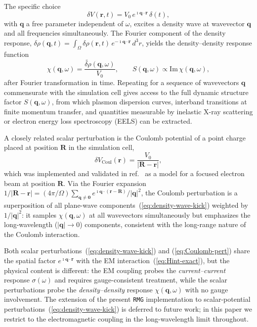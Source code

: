 {{The specific choice
\begin{equation}
  \delta V(\mathbf{r},t)
  = V_0\,e^{\imath\mathbf{q}\cdot\mathbf{r}}\,\delta(t),
  \label{eq:density-wave-kick}
\end{equation}
with $\mathbf{q}$ a free parameter independent of $\omega$,
excites a density wave at wavevector $\mathbf{q}$ and all
frequencies simultaneously.
The Fourier component of the density response,
$\delta\rho(\mathbf{q},t) =
\int_\Omega\delta\rho(\mathbf{r},t)\,e^{-\imath\mathbf{q}\cdot\mathbf{r}}
\,d^3r$,
yields the density--density response function
\begin{equation}
  \chi(\mathbf{q},\omega)
  = \frac{\widetilde{\delta\rho}(\mathbf{q},\omega)}{V_0},
  \qquad
  S(\mathbf{q},\omega) \propto \mathrm{Im}\,\chi(\mathbf{q},\omega),
  \label{eq:chi-q}
\end{equation}
after Fourier transformation in time.
Repeating for a sequence of wavevectors $\mathbf{q}$ commensurate
with the simulation cell gives access to the full dynamic structure
factor $S(\mathbf{q},\omega)$, from which plasmon dispersion curves,
interband transitions at finite momentum transfer, and quantities
measurable by inelastic X-ray scattering or electron energy loss
spectroscopy (EELS) can be extracted.

A closely related scalar perturbation is the Coulomb potential of a
point charge placed at position $\mathbf{R}$ in the simulation cell,
\begin{equation}
  \delta V_\mathrm{Coul}(\mathbf{r})
  = \frac{V_0}{|\mathbf{R}-\mathbf{r}|},
  \label{eq:Coulomb-pert}
\end{equation}
which was implemented and validated in ref.~\cite{jakowski-tddft-coulomb-2019}
 as a model for a focused
electron beam at position $\mathbf{R}$.
Via the Fourier expansion
$1/|\mathbf{R}-\mathbf{r}|
=(4\pi/\Omega)\sum_{\mathbf{q}\neq\mathbf{0}}
e^{\imath\mathbf{q}\cdot(\mathbf{r}-\mathbf{R})}/|\mathbf{q}|^2$,
the Coulomb perturbation is a superposition of all plane-wave
components~(\ref{eq:density-wave-kick}) weighted by $1/|\mathbf{q}|^2$:
it samples $\chi(\mathbf{q},\omega)$ at all wavevectors simultaneously
but emphasizes the long-wavelength ($|\mathbf{q}|\to0$) components,
consistent with the long-range nature of the Coulomb interaction.

Both scalar perturbations~(\ref{eq:density-wave-kick}) and
(\ref{eq:Coulomb-pert}) share the spatial factor
$e^{\imath\mathbf{q}\cdot\mathbf{r}}$ with the EM
interaction~(\ref{eq:Hint-exact}), but the physical content is
different: the EM coupling probes the \emph{current--current}
response $\sigma(\omega)$ and requires gauge-consistent treatment,
while the scalar perturbations probe the \emph{density--density}
response $\chi(\mathbf{q},\omega)$ with no gauge involvement.
The extension of the present \texttt{RMG} implementation to
scalar-potential perturbations~(\ref{eq:density-wave-kick}) is
deferred to future work; in this paper we restrict to the
electromagnetic coupling in the long-wavelength limit throughout.


}}
